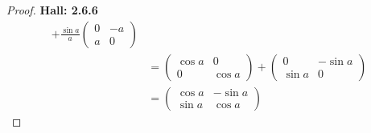 \documentclass[11pt]{article}
\theoremstyle{definition}
\begin{document}
\begin{proof}{\textbf{Hall: 2.6.6}}
\begin{align*}
    + \frac{\sin a}{a}\begin{pmatrix}0 & -a\\ a & 0\end{pmatrix}\\
    &= \begin{pmatrix}\cos a & 0\\ 0 & \cos a\end{pmatrix}
    + \begin{pmatrix}0 & -\sin a\\ \sin a & 0\end{pmatrix}\\
    &= \begin{pmatrix}\cos a & -\sin a\\ \sin a & \cos a\end{pmatrix}
\end{align*}
\end{proof}
\cleardoublepage
\end{document}
